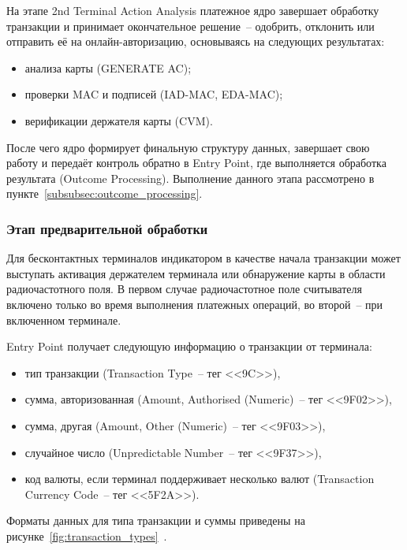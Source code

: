 На этапе 2nd Terminal Action Analysis платежное ядро завершает обработку транзакции и принимает окончательное решение~-- одобрить, отклонить или отправить её на онлайн-авторизацию, основываясь на следующих результатах:

\begin{itemize}
    \item анализа карты (GENERATE AC);
    \item проверки MAC и подписей (IAD-MAC, EDA-MAC);
    \item верификации держателя карты (CVM).
\end{itemize}

После чего ядро формирует финальную структуру данных, завершает свою работу и передаёт контроль обратно в Entry Point, где выполняется обработка результата (Outcome Processing).
Выполнение данного этапа рассмотрено в пункте~\ref{subsubsec:outcome_processing}.


\subsubsection{Этап предварительной обработки}
\label{subsubsec:pre-processing}

Для бесконтактных терминалов индикатором в качестве начала транзакции может выступать активация держателем терминала или обнаружение карты в области радиочастотного поля.
В первом случае радиочастотное поле считывателя включено только во время выполнения платежных операций, во второй~-- при включенном терминале.

Entry Point получает следующую информацию о транзакции от терминала:

\begin{itemize}
    \item тип транзакции (Transaction Type~-- тег <<9C>>),
    \item сумма, авторизованная (Amount, Authorised (Numeric)~-- тег <<9F02>>),
    \item сумма, другая (Amount, Other (Numeric)~-- тег <<9F03>>),
    \item случайное число (Unpredictable Number~-- тег <<9F37>>),
    \item код валюты, если терминал поддерживает несколько валют (Transaction Currency Code~-- тег <<5F2A>>).
\end{itemize}

Форматы данных для типа транзакции и суммы приведены на рисунке~\ref{fig:transaction_types}~\cite{emv_book_A}.

